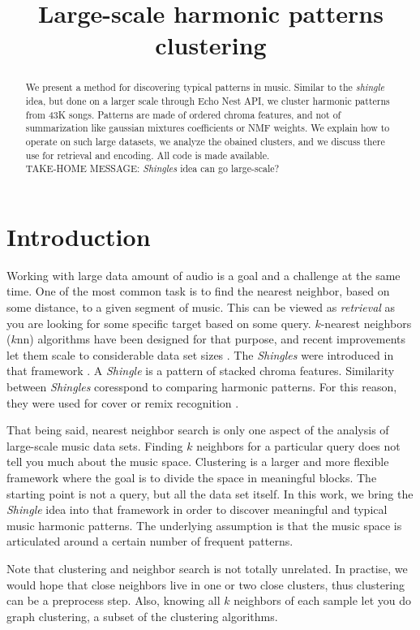 \documentclass{article}
\title{Large-scale harmonic patterns clustering}
\begin{document}
%
\maketitle
%
\begin{abstract}
We present a method for discovering typical patterns in music.
Similar to the \textit{shingle} idea, but done on a larger scale through
Echo Nest API, we cluster harmonic patterns from 43K songs. Patterns are
made of ordered chroma features, and not of summarization like gaussian
mixtures coefficients or NMF weights. We explain
how to operate on such large datasets, we analyze the obained clusters,
and we discuss there use for retrieval and encoding. All code is made
available.\\
TAKE-HOME MESSAGE: \textit{Shingles} idea can go large-scale?
\end{abstract}
%
\section{Introduction}\label{sec:introduction}

Working with large data amount of audio is a goal and a challenge at the
same time. One of the most common task is to find the nearest neighbor,
based on some distance, to a given segment of music. This can be viewed
as \textit{retrieval} as you are looking for some specific target
based on some query. $k$-nearest neighbors ($k$nn) algorithms have been
designed for that purpose, and recent improvements let them scale to
considerable data set sizes \cite{Datar2004}. The \textit{Shingles}
were introduced in that framework \cite{Casey2006}. A \textit{Shingle}
is a pattern of stacked chroma features. Similarity between
\textit{Shingles} coresspond to comparing harmonic patterns. For this
reason, they were used for cover or remix recognition \cite{Casey2007}.

That being said, nearest neighbor search is only one aspect of the
analysis of large-scale music data sets. Finding $k$ neighbors for a
particular query does not tell you much about the music space.
Clustering is a larger and more flexible framework where the goal is
to divide the space in meaningful blocks. The starting point is not
a query, but all the data set itself. In this work, we bring the
\textit{Shingle} idea into that framework in order to discover
meaningful and typical music harmonic patterns. The underlying assumption
is that the music space is articulated around a certain number of
frequent patterns.

Note that clustering and neighbor search is not totally unrelated.
In practise, we would hope that close neighbors live in one or two
close clusters, thus clustering can be a preprocess step. Also,
knowing all $k$ neighbors of each sample let you do graph clustering,
a subset of the clustering algorithms.
\end{document}
